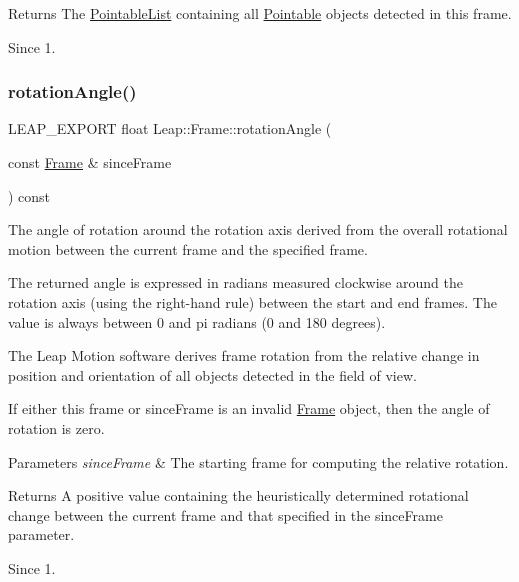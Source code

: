 \begin{DoxyReturn}{Returns}
The \hyperlink{class_leap_1_1_pointable_list}{Pointable\+List} containing all \hyperlink{class_leap_1_1_pointable}{Pointable} objects detected in this frame. 
\end{DoxyReturn}
\begin{DoxySince}{Since}
1. 
\end{DoxySince}
\mbox{\label{class_leap_1_1_frame_a0d54882e92aaed1d8be42e316dcdea3a}} 
\subsubsection{\texorpdfstring{rotation\+Angle()}{rotationAngle()}\hspace{0.1cm}{\footnotesize\ttfamily [1/2]}}
{\footnotesize\ttfamily L\+E\+A\+P\+\_\+\+E\+X\+P\+O\+RT float Leap\+::\+Frame\+::rotation\+Angle (\begin{DoxyParamCaption}\item[{const \hyperlink{class_leap_1_1_frame}{Frame} \&}]{since\+Frame }\end{DoxyParamCaption}) const}

The angle of rotation around the rotation axis derived from the overall rotational motion between the current frame and the specified frame.

The returned angle is expressed in radians measured clockwise around the rotation axis (using the right-\/hand rule) between the start and end frames. The value is always between 0 and pi radians (0 and 180 degrees).


\begin{DoxyCodeInclude}
\end{DoxyCodeInclude}


The Leap Motion software derives frame rotation from the relative change in position and orientation of all objects detected in the field of view.

If either this frame or since\+Frame is an invalid \hyperlink{class_leap_1_1_frame}{Frame} object, then the angle of rotation is zero.


\begin{DoxyParams}{Parameters}
{\em since\+Frame} & The starting frame for computing the relative rotation. \\
\hline
\end{DoxyParams}
\begin{DoxyReturn}{Returns}
A positive value containing the heuristically determined rotational change between the current frame and that specified in the since\+Frame parameter. 
\end{DoxyReturn}
\begin{DoxySince}{Since}
1. 
\end{DoxySince}
\mbox{\label{class_leap_1_1_frame_af20293cf001ffbdd6d18d2a0704b4eac}} 
